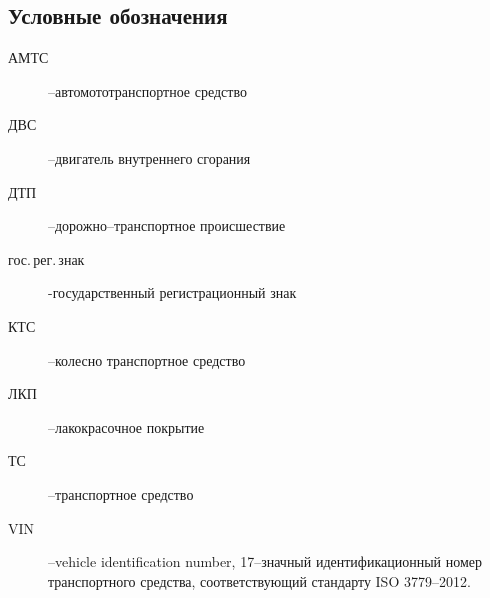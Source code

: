 \subsection{Условные обозначения}
\begin{description}
%	 
\item[АМТС] --автомототранспортное средство
\item[ДВС] --двигатель внутреннего сгорания
\item[ДТП] --дорожно--транспортное происшествие
\item[гос.\,рег.\,знак] -государственный регистрационный знак
\item[КТС] --колесно транспортное средство 
\item[ЛКП] --лакокрасочное покрытие
\item[ТС] --транспортное средство
\item[VIN] --vehicle identification number, 17--значный идентификационный номер транспортного средства, соответствующий стандарту ISO 3779--2012.
%
\end{description}
%
